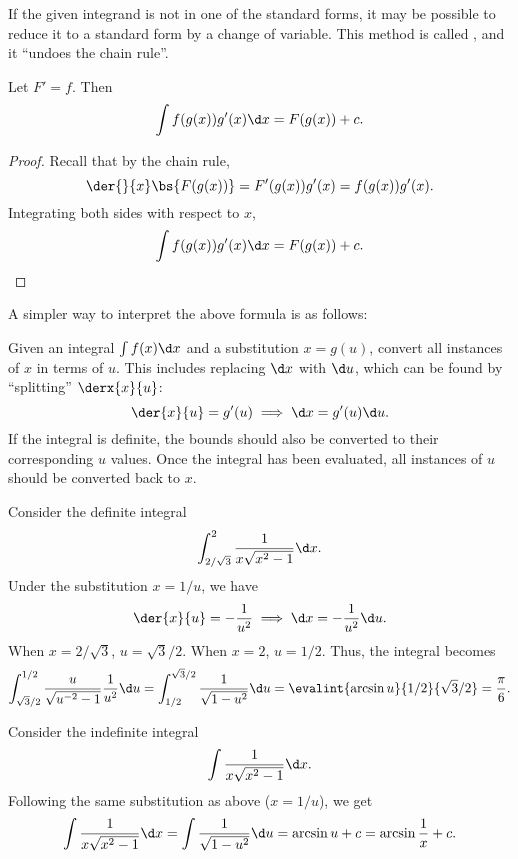 If the given integrand is not in one of the standard forms, it may be possible to reduce it to a standard form by a change of variable. This method is called , and it ``undoes the chain rule''.

\begin{proposition}
    Let $F' = f$. Then \[\int f(g(x)) g'(x) \d x = F(g(x)) + c.\]
\end{proposition}
\begin{proof}
    Recall that by the chain rule, \[\der{}{x} \bs{F(g(x))} = F'(g(x)) g'(x) = f(g(x)) g'(x).\] Integrating both sides with respect to $x$, \[\int f(g(x)) g'(x) \d x = F(g(x)) + c.\]
\end{proof}

A simpler way to interpret the above formula is as follows:

\begin{recipe}
    Given an integral $\int f(x) \d x$ and a substitution $x = g(u)$, convert all instances of $x$ in terms of $u$. This includes replacing $\d x$ with $\d u$, which can be found by ``splitting'' $\derx{x}{u}$: \[\der{x}{u} = g'(u) \implies \d x = g'(u) \d u.\] If the integral is definite, the bounds should also be converted to their corresponding $u$ values. Once the integral has been evaluated, all instances of $u$ should be converted back to $x$.
\end{recipe}

\begin{example}
    Consider the definite integral \[\int_{2/\sqrt3}^2 \frac1{x\sqrt{x^2 - 1}} \d x.\] Under the substitution $x = 1/u$, we have \[\der{x}{u} = -\frac1{u^2} \implies \d x = -\frac1{u^2} \d u.\] When $x = 2/\sqrt 3$, $u = \sqrt3/2$. When $x = 2$, $u = 1/2$. Thus, the integral becomes \[\int_{\sqrt3 / 2}^{1/2} \frac{u}{\sqrt{u^{-2} - 1}} \frac1{u^2} \d u = \int_{1/2}^{\sqrt3 /2} \frac1{\sqrt{1 - u^2}} \d u = \evalint{\arcsin u}{1/2}{\sqrt3 /2} = \frac\pi6.\]
\end{example}

\begin{example}
    Consider the indefinite integral \[\int \frac1{x\sqrt{x^2 - 1}} \d x.\] Following the same substitution as above ($x = 1/u$), we get \[\int \frac1{x\sqrt{x^2 - 1}} \d x = \int \frac1{\sqrt{1 - u^2}} \d u = \arcsin u + c = \arcsin \frac1x + c.\] 
\end{example}

